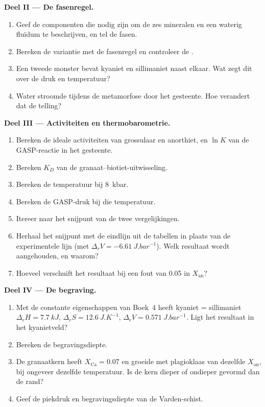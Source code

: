\begin{problem}
\medskip\noindent\textbf{Deel II --- De fasenregel.}
\begin{enumerate}[resume]
  \item Geef de componenten die nodig zijn om de zes mineralen en een waterig
        fluïdum te beschrijven, en tel de fasen.
  \item Bereken de variantie met de fasenregel en controleer de .
  \item Een tweede monster bevat kyaniet en sillimaniet naast elkaar. Wat zegt
        dit over de druk en temperatuur?
  \item Water stroomde tijdens de metamorfose door het gesteente. Hoe verandert
        dat de telling?
\end{enumerate}

\medskip\noindent\textbf{Deel III --- Activiteiten en thermobarometrie.}
\begin{enumerate}[resume]
  \item Bereken de ideale activiteiten van grossulaar en anorthiet, en $\ln K$
        van de GASP-reactie in het gesteente.
  \item Bereken $K_D$ van de granaat--biotiet-uitwisseling.
  \item Bereken de temperatuur bij \qty{8}{kbar}.
  \item Bereken de GASP-druk bij die temperatuur.
  \item Itereer naar het snijpunt van de twee vergelijkingen.
  \item Herhaal het snijpunt met de eindlijn uit de tabellen in plaats van
        de experimentele lijn (met $\Delta_rV = \qty{-6.61}{J.bar^{-1}}$).
        Welk resultaat wordt aangehouden, en waarom?
  \item Hoeveel verschuift het resultaat bij een fout van 0.05 in
        $X_{\text{an}}$?
\end{enumerate}

\medskip\noindent\textbf{Deel IV --- De begraving.}
\begin{enumerate}[resume]
  \item Met de constante eigenschappen van Boek~4 heeft kyaniet =
        sillimaniet $\Delta_rH = \qty{7.7}{kJ}$, $\Delta_rS =
        \qty{12.6}{J.K^{-1}}$, $\Delta_rV = \qty{0.571}{J.bar^{-1}}$. Ligt het
        resultaat in het kyanietveld?
  \item Bereken de begravingsdiepte.
  \item De granaatkern heeft $X_{\text{Ca}} = 0.07$ en groeide met plagioklaas
        van dezelfde $X_{\text{an}}$, bij ongeveer dezelfde temperatuur. Is de
        kern dieper of ondieper gevormd dan de rand?
  \item Geef de piekdruk en begravingsdiepte van de Varden-schist.
\end{enumerate}
\end{problem}
